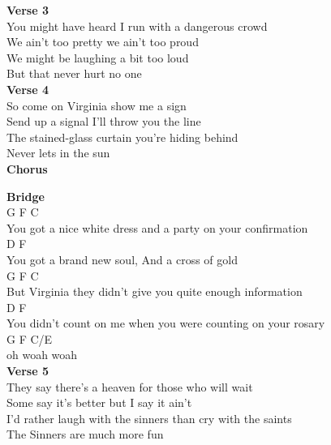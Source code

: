 \documentclass[a4paper]{article}
\begin{document}
{{        }
        \textbf{Verse 3}
        ~\\
        {
            \cutive
            \obeyspaces
You might have heard I run with a dangerous crowd
\\
We ain't too pretty we ain't too proud
\\
We might be laughing a bit too loud
\\
But that never hurt no one
\\

        }
        \textbf{Verse 4}
        ~\\
        {
            \cutive
            \obeyspaces
So come on Virginia show me a sign
\\
Send up a signal I'll throw you the line
\\
The stained-glass curtain you're hiding behind
\\
Never lets in the sun
\\

        }
        \textbf{Chorus}
        ~\\
        {
            \cutive
            \obeyspaces

        }
        \textbf{Bridge}
        ~\\
        {
            \cutive
            \obeyspaces
          G                      F                       C
\\
You got a nice white dress and a party on your confirmation
\\
          D                        F
\\
You got a brand new soul, And a cross of gold
\\
       G                           F                    C
\\
But Virginia they didn't give you quite enough information
\\
            D                                         F
\\
You didn't count on me when you were counting on your rosary
\\
G  F    C/E
\\
oh woah woah
\\

        }
        \textbf{Verse 5}
        ~\\
        {
            \cutive
            \obeyspaces
They say there's a heaven for those who will wait
\\
Some say it's better but I say it ain't
\\
I'd rather laugh with the sinners than cry with the saints
\\
The Sinners are much more fun
\\

}}
\end{document}

